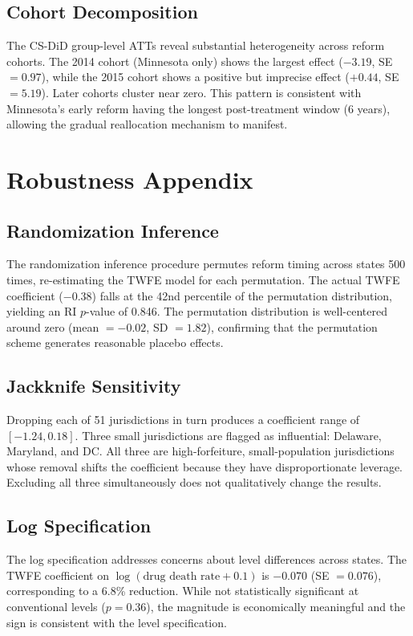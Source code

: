 \documentclass[12pt]{article}
\begin{document}
\subsection{Cohort Decomposition}

The CS-DiD group-level ATTs reveal substantial heterogeneity across reform cohorts. The 2014 cohort (Minnesota only) shows the largest effect ($-3.19$, SE $= 0.97$), while the 2015 cohort shows a positive but imprecise effect ($+0.44$, SE $= 5.19$). Later cohorts cluster near zero. This pattern is consistent with Minnesota's early reform having the longest post-treatment window (6 years), allowing the gradual reallocation mechanism to manifest.


\section{Robustness Appendix}
\label{app:robust}

\subsection{Randomization Inference}

The randomization inference procedure permutes reform timing across states 500 times, re-estimating the TWFE model for each permutation. The actual TWFE coefficient ($-0.38$) falls at the 42nd percentile of the permutation distribution, yielding an RI $p$-value of 0.846. The permutation distribution is well-centered around zero (mean $= -0.02$, SD $= 1.82$), confirming that the permutation scheme generates reasonable placebo effects.

\subsection{Jackknife Sensitivity}

Dropping each of 51 jurisdictions in turn produces a coefficient range of $[-1.24, 0.18]$. Three small jurisdictions are flagged as influential: Delaware, Maryland, and DC. All three are high-forfeiture, small-population jurisdictions whose removal shifts the coefficient because they have disproportionate leverage. Excluding all three simultaneously does not qualitatively change the results.

\subsection{Log Specification}

The log specification addresses concerns about level differences across states. The TWFE coefficient on $\log(\text{drug death rate} + 0.1)$ is $-0.070$ (SE $= 0.076$), corresponding to a 6.8\% reduction. While not statistically significant at conventional levels ($p = 0.36$), the magnitude is economically meaningful and the sign is consistent with the level specification.
\end{document}
